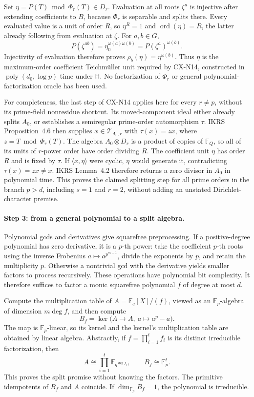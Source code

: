 \documentclass[11pt,a4paper]{article}
\begin{document}
Set \(\eta=P(T)\bmod\Phi_r(T)\in D_r\).
Evaluation at all roots \(\zeta^a\) is injective after extending
coefficients to \(B\), because \(\Phi_r\) is separable and
splits there.
Every evaluated value is a unit of order \(R\), so
\(\eta^R=1\) and \(\operatorname{ord}(\eta)=R\), the latter
already following from evaluation at \(\zeta\).
For \(a,b\in G\),
\[
 P(\zeta^{ab})
 =\eta_0^{\omega(a)\omega(b)}
 =P(\zeta^a)^{\omega(b)}.
\]
Injectivity of evaluation therefore proves
\(\rho_b(\eta)=\eta^{\omega(b)}\).
Thus \(\eta\) is the maximum-order coefficient Teichm\"uller
unit required by CX-N14, constructed in
\(\operatorname{poly}(d_0,\log p)\) time under \(\mathsf H\).
No factorization of \(\Phi_r\) or general polynomial-factorization
oracle has been used.

For completeness, the last step of CX-N14 applies here for
every \(r\ne p\), without its prime-field nonresidue shortcut.
Its moved-component ideal either already splits \(A_0\), or
establishes a semiregular prime-order automorphism \(\tau\).
IKRS Proposition~4.6 then supplies
\(x\in\mathcal T_{A_0,r}\) with
\(\tau(x)=z x\), where \(z=T\bmod\Phi_r(T)\).
The algebra \(A_0\otimes D_r\) is a product of copies of
\(\mathbb F_Q\), so all of its units of \(r\)-power order have
order dividing \(R\).
The coefficient unit \(\eta\) has order \(R\) and is fixed
by \(\tau\). If \(\langle x,\eta\rangle\) were cyclic,
\(\eta\) would generate it, contradicting
\(\tau(x)=zx\ne x\).
IKRS Lemma~4.2 therefore returns a zero divisor in \(A_0\)
in polynomial time.
This proves the claimed splitting step for all prime orders in
the branch \(p>d\), including \(s=1\) and \(r=2\), without
adding an unstated Dirichlet-character premise.

\paragraph{Step 3: from a general polynomial to a split algebra.}
Polynomial gcds and derivatives give squarefree preprocessing.
If a positive-degree polynomial has zero derivative, it is a
\(p\)-th power: take the coefficient \(p\)-th roots using the
inverse Frobenius \(a\mapsto a^{p^{m-1}}\), divide the exponents
by \(p\), and retain the multiplicity \(p\).
Otherwise a nontrivial gcd with the derivative yields smaller
factors to process recursively.
These operations have polynomial bit complexity.
It therefore suffices to factor a monic squarefree polynomial
\(f\) of degree at most \(d\).

Compute the multiplication table of
\(A=\mathbb F_q[X]/(f)\), viewed as an
\(\mathbb F_p\)-algebra of dimension \(m\deg f\), and then
compute
\[
 B_f=\ker\bigl(A\longrightarrow A,\ a\longmapsto a^p-a\bigr).
\]
The map is \(\mathbb F_p\)-linear, so its kernel and the kernel's
multiplication table are obtained by linear algebra.
Abstractly, if \(f=\prod_{i=1}^t f_i\) is its distinct
irreducible factorization, then
\[
 A\cong\prod_{i=1}^t\mathbb F_{q^{\deg f_i}},
 \qquad B_f\cong\mathbb F_p^t.
\]
This proves the split promise without knowing the factors.
The primitive idempotents of \(B_f\) and \(A\) coincide.
If \(\dim_{\mathbb F_p}B_f=1\), the polynomial is irreducible.
\end{document}
